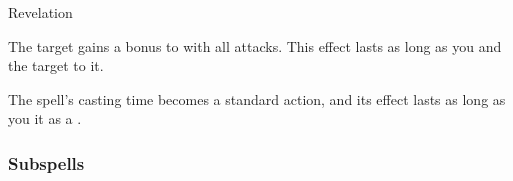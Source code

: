 \newpage
\begin{spellsection}{Revelation}

\begin{spellheader}
\end{spellheader}

\begin{spellcontent}

\begin{spelltargetinginfo}



\end{spelltargetinginfo}


\begin{spelleffects}



\spelleffect
The target gains a  bonus to  with all attacks.
This effect lasts as long as you and the target  to it.








\end{spelleffects}

\end{spellcontent}
\begin{spellfooter}


\end{spellfooter}
\begin{spellsubcontent}


\begin{spellcantrip}
The spell's casting time becomes a standard action, and its effect lasts as long as you  it as a .
\end{spellcantrip}


\end{spellsubcontent}
\end{spellsection}


\subsubsection{Subspells}






